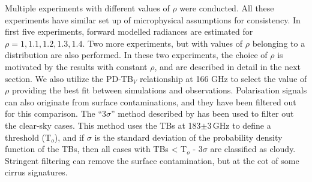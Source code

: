\documentclass[amt, manuscript]{copernicus}
\begin{document}
Multiple experiments with different values of $\rho$ were conducted. All these experiments have similar set up of microphysical assumptions for consistency. In first five experiments, forward modelled radiances are estimated for $\rho = 1,1.1, 1.2, 1.3, 1.4$. Two more experiments, but with values of $\rho$ belonging to a distribution are also performed. In these two experiments, the choice of $\rho$ is motivated by the results with constant $\rho$, and are described in detail in the next section. We also utilize the PD-TB$_V$ relationship at 166\,\,GHz to select the value of $\rho$ providing the best fit between simulations and observations. Polarisation signals can also originate from surface contaminations, and they have been filtered out for this comparison.  The  ``3$\sigma$'' method described by \citet{gong:micro:17} has been used to filter out the clear-sky cases. This method uses the TBs at 183$\pm$3\,GHz to define a threshold (T$_o$), and if  $\sigma$ is the standard deviation of the probability density function of the TBs, then all cases with TBs < T$_o$ - 3$\sigma$ are classified as cloudy. Stringent filtering can remove the surface contamination, but at the cot of some cirrus signatures.


\end{document}
